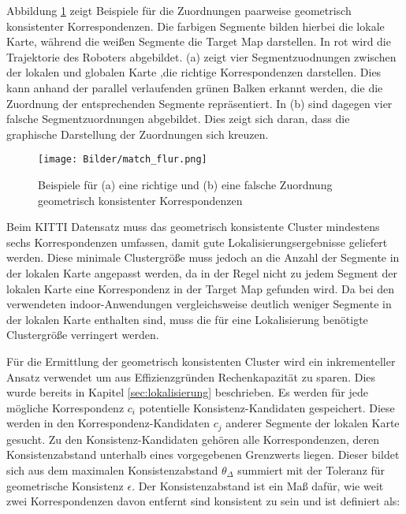 Abbildung \ref{fig:vgl_match_flur} zeigt Beispiele für die Zuordnungen paarweise geometrisch konsistenter Korrespondenzen. Die farbigen Segmente bilden hierbei die lokale Karte, während die weißen Segmente die Target Map darstellen. In rot wird die Trajektorie des Roboters abgebildet. (a) zeigt vier Segmentzuodnungen zwischen der lokalen und globalen Karte ,die richtige Korrespondenzen darstellen. Dies kann anhand der parallel verlaufenden grünen Balken erkannt werden, die die Zuordnung der entsprechenden Segmente repräsentiert. In (b) sind dagegen vier falsche Segmentzuordnungen abgebildet. Dies zeigt sich daran, dass die graphische Darstellung der Zuordnungen sich kreuzen. 

\begin{figure}
	\centering
	\texttt{[image: Bilder/match\_flur.png]}
	\caption{Beispiele für (a) eine richtige und (b) eine falsche Zuordnung geometrisch konsistenter Korrespondenzen}
	\label{fig:vgl_match_flur}
\end{figure}

Beim KITTI Datensatz muss das geometrisch konsistente Cluster mindestens sechs Korrespondenzen umfassen, damit gute Lokalisierungsergebnisse geliefert werden. Diese minimale Clustergröße muss jedoch an die Anzahl der Segmente in der lokalen Karte angepasst werden, da in der Regel nicht zu jedem Segment der lokalen Karte eine Korrespondenz in der Target Map gefunden wird. Da bei den verwendeten indoor-Anwendungen vergleichsweise deutlich weniger Segmente in der lokalen Karte enthalten sind, muss die für eine Lokalisierung benötigte Clustergröße verringert werden. 

Für die Ermittlung der geometrisch konsistenten Cluster wird ein inkrementeller Ansatz verwendet um aus Effizienzgründen Rechenkapazität zu sparen. Dies wurde bereits in Kapitel \ref{sec:lokalisierung} beschrieben. Es werden für jede mögliche Korrespondenz $c_i$ potentielle Konsistenz-Kandidaten gespeichert. Diese werden in den Korrespondenz-Kandidaten $ c_j $ anderer Segmente der lokalen Karte gesucht. Zu den Konsistenz-\linebreak Kandidaten gehören alle Korrespondenzen, deren Konsistenzabstand unterhalb eines vorgegebenen Grenzwerts liegen. Dieser bildet sich aus dem maximalen Konsistenzabstand $ \theta_\Delta $ summiert mit der Toleranz für geometrische Konsistenz $\epsilon$. Der Konsistenzabstand ist ein Maß dafür, wie weit zwei Korrespondenzen davon entfernt sind konsistent zu sein und ist definiert als: 

